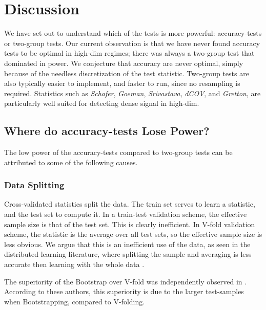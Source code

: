 \documentclass[]{bio}
\begin{document}
\section{Discussion}
\label{sec:discussion}

We have set out to understand which of the tests is more powerful: accuracy-tests or two-group tests. 
Our current observation is that we have never found accuracy tests to be optimal in high-dim regimes; there was always a two-group test that dominated in power.
We conjecture that accuracy are never optimal, simply because of the needless discretization of the test statistic. 
Two-group tests are also typically easier to implement, and faster to run, since no resampling is required. 
Statistics such as \emph{Schafer}, \emph{Goeman}, \emph{Srivastava}, \emph{dCOV}, and \emph{Gretton}, are particularly well suited for detecting dense signal in high-dim.



\subsection{Where do accuracy-tests Lose Power?}
The low power of the accuracy-tests compared to two-group tests can be attributed to some of the following causes.

\subsubsection{Data Splitting}
Cross-validated statistics split the data.
The train set serves to learn a statistic, and the test set to compute it.
In a train-test validation scheme, the effective sample size is that of the test set.
This is clearly inefficient. 
In V-fold validation scheme, the statistic is the average over all test sets, so the effective sample size is less obvious. 
We argue that this is an inefficient use of the data, as seen in the distributed learning literature, where splitting the sample and averaging is less accurate then learning with the whole data \cite{rosenblatt2016optimality}.

The superiority of the Bootstrap over V-fold was independently observed in \cite{yu2007two}. 
According to these authors, this superiority is due to the larger test-samples when Bootstrapping, compared to V-folding.
\end{document}
